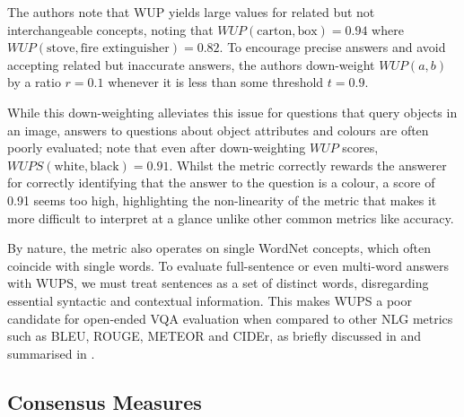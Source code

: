 The authors note that WUP yields large values for related but not interchangeable concepts, noting that \(WUP(\text{carton}, \text{box}) = 0.94\) where \(WUP(\text{stove}, \text{fire extinguisher}) = 0.82\). To encourage precise answers and avoid accepting related but inaccurate answers, the authors down-weight \(WUP(a, b)\) by a ratio \(r = 0.1\) whenever it is less than some threshold \(t = 0.9\).

While this down-weighting alleviates this issue for questions that query objects in an image, answers to questions about object attributes and colours are often poorly evaluated; \citeauthor{kafle2017visual} note that even after down-weighting \(WUP\) scores, \(WUPS(\text{white}, \text{black}) = 0.91\). Whilst the metric correctly rewards the answerer for correctly identifying that the answer to the question is a colour, a score of 0.91 seems too high, highlighting the non-linearity of the metric that makes it more difficult to interpret at a glance unlike other common metrics like accuracy.

By nature, the metric also operates on single WordNet concepts, which often coincide with single words. To evaluate full-sentence or even multi-word answers with WUPS, we must treat sentences as a set of distinct words, disregarding essential syntactic and contextual information. This makes WUPS a poor candidate for open-ended VQA evaluation when compared to other NLG metrics such as BLEU, ROUGE, METEOR and CIDEr, as briefly discussed in \subsectionautorefname{ \ref{subsection:open_ended_vqa_metrics}} and summarised in \tableautorefname{ \ref{tab:vqa_metrics_comparison}}.




\subsection{Consensus Measures}
\label{subsection:consensus_measures}


